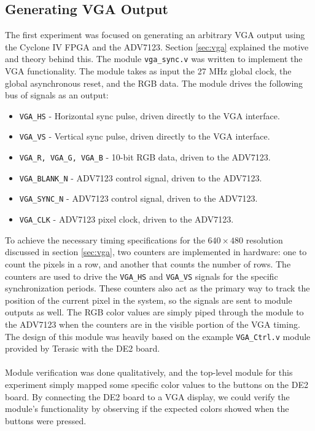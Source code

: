 \documentclass[11pt]{article} %
\begin{document}
\subsection{Generating VGA Output}
The first experiment was focused on generating an arbitrary VGA output using the Cyclone IV FPGA and the ADV7123. Section \ref{sec:vga} explained the motive and theory behind this. The module \texttt{vga\_sync.v} was written to implement the VGA functionality. The module takes as input the 27 MHz global clock, the global asynchronous reset, and the RGB data. The module drives the following bus of signals as an output:
\begin{itemize}
\item \texttt{VGA\_HS} - Horizontal sync pulse, driven directly to the VGA interface.
\item \texttt{VGA\_VS} - Vertical sync pulse, driven directly to the VGA interface.
\item \texttt{VGA\_R, VGA\_G, VGA\_B} - 10-bit RGB data, driven to the ADV7123.
\item \texttt{VGA\_BLANK\_N} - ADV7123 control signal, driven to the ADV7123.
\item \texttt{VGA\_SYNC\_N} - ADV7123 control signal, driven to the ADV7123. 
\item \texttt{VGA\_CLK} - ADV7123 pixel clock, driven to the ADV7123.
\end{itemize}
To achieve the necessary timing specifications for the $640 \times 480$ resolution discussed in section \ref{sec:vga}, two counters are implemented in hardware: one to count the pixels in a row, and another that counts the number of rows. The counters are used to drive the \texttt{VGA\_HS} and \texttt{VGA\_VS} signals for the specific synchronization periods. These counters also act as the primary way to track the position of the current pixel in the system, so the signals are sent to module outputs as well. The RGB color values are simply piped through the module to the ADV7123 when the counters are in the visible portion of the VGA timing. The design of this module was heavily based on the example \texttt{VGA\_Ctrl.v} module provided by Terasic with the DE2 board. \\\\
Module verification was done qualitatively, and the top-level module for this experiment simply mapped some specific color values to the buttons on the DE2 board. By connecting the DE2 board to a VGA display, we could verify the module's functionality by observing if the expected colors showed when the buttons were pressed.
\end{document}
